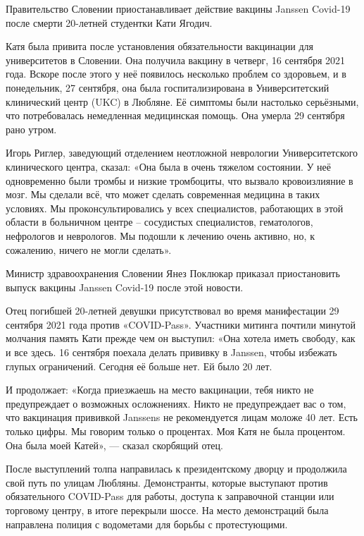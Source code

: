 Правительство Словении приостанавливает действие вакцины Janssen Covid-19 после
смерти 20-летней студентки Кати Ягодич.

Катя была привита после установления обязательности вакцинации для университетов
в Словении. Она получила вакцину в четверг, 16 сентября 2021 года. Вскоре после
этого у неё появилось несколько проблем со здоровьем, и в понедельник, 27
сентября, она была госпитализирована в Университетский клинический центр (UKC) в
Любляне. Её симптомы были настолько серьёзными, что потребовалась немедленная
медицинская помощь. Она умерла 29 сентября рано утром.

Игорь Риглер, заведующий отделением неотложной неврологии Университетского
клинического центра, сказал: «Она была в очень тяжелом состоянии. У неё
одновременно были тромбы и низкие тромбоциты, что вызвало кровоизлияние в
мозг. Мы сделали всё, что может сделать современная медицина в таких
условиях. Мы проконсультировались у всех специалистов, работающих в этой области
в больничном центре – сосудистых специалистов, гематологов, нефрологов и
неврологов. Мы подошли к лечению очень активно, но, к сожалению, ничего не могли
сделать».

Министр здравоохранения Словении Янез Поклюкар приказал приостановить выпуск
вакцины Janssen Covid-19 после этой новости.

Отец погибшей 20-летней девушки присутствовал во время манифестации 29 сентября
2021 года против «COVID-Pass». Участники митинга почтили минутой молчания память
Кати прежде чем он выступил: «Она хотела иметь свободу, как и все здесь. 16
сентября поехала делать прививку в Janssen, чтобы избежать глупых
ограничений. Сегодня её больше нет. Ей было 20 лет.

И продолжает: «Когда приезжаешь на место вакцинации, тебя никто не предупреждает
о возможных осложнениях. Никто не предупреждает вас о том, что вакцинация
прививкой Janssens не рекомендуется лицам моложе 40 лет. Есть только цифры. Мы
говорим только о процентах. Моя Катя не была процентом. Она была моей Катей», —
сказал скорбящий отец.

После выступлений толпа направилась к президентскому дворцу и продолжила свой
путь по улицам Любляны. Демонстранты, которые выступают против обязательного
COVID-Pass для работы, доступа к заправочной станции или торговому центру, в
итоге перекрыли шоссе. На место демонстраций была направлена полиция с
водометами для борьбы с протестующими.
